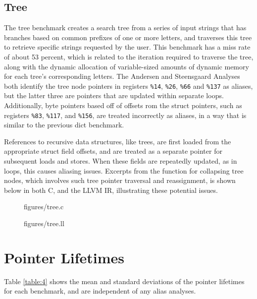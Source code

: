 \subsection{Tree}
The tree benchmark creates a search tree from a series of input strings that has branches based on common prefixes of one or more letters, and traverses this tree to retrieve specific strings requested by the user. This benchmark has a miss rate of about 53 percent, which is related to the iteration required to traverse the tree, along with the dynamic allocation of variable-sized amounts of dynamic memory for each tree's corresponding letters. The Andersen and Steensgaard Analyses both identify the tree node pointers in registers \texttt{\%14}, \texttt{\%26}, \texttt{\%66} and \texttt{\%137} as aliases, but the latter three are pointers that are updated within separate loops. Additionally, byte pointers based off of offsets rom the struct pointers, such as registers \texttt{\%83}, \texttt{\%117}, and \texttt{\%156}, are treated incorrectly as aliases, in a way that is similar to the previous dict benchmark.

References to recursive data structures, like trees, are first loaded from the appropriate struct field offsets, and are treated as a separate pointer for subsequent loads and stores. When these fields are repeatedly updated, as in loops, this causes aliasing issues. Excerpts from the function for collapsing tree nodes, which involves such tree pointer traversal and reassignment, is shown below in both C, and the LLVM IR, illustrating these potential issues.

\begin{figure} [h]
   {figures/tree.c}
  \label{fig:treec}
\end{figure}

\begin{figure} [h]
   {figures/tree.ll}
  \label{fig:treell}
\end{figure}

\section{Pointer Lifetimes}
Table \ref{table:4} shows the mean and standard deviations of the pointer lifetimes for each benchmark, and are independent of any alias analyses.

